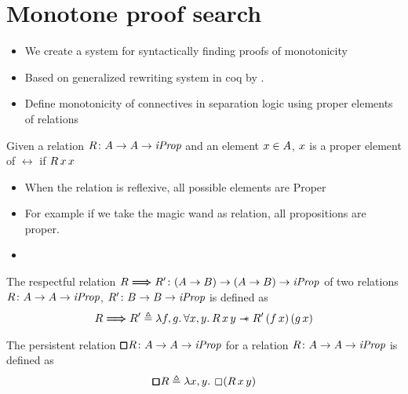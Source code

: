 \documentclass[thesis.tex]{subfiles}
\begin{document}
\section{Monotone proof search}
\begin{itemize}
    \item We create a system for syntactically finding proofs of monotonicity
    \item Based on generalized rewriting system in coq by  \cite*{sozeauNewLookGeneralized2009}.
    \item {} Define monotonicity of connectives in separation logic using proper elements of relations
\end{itemize}

\begin{definition}
    Given a relation $R\colon A\to A\to\textit{iProp}$ and an element $x\in A$, $x$ is a proper element of $\rel$ if $R\, x\, x$
\end{definition}
\begin{itemize}
    \item When the relation is reflexive, all possible elements are Proper
    \item For example if we take the magic wand as relation, all propositions are proper.
    \item
\end{itemize}
\begin{definition}
    The respectful relation $R \bm{\Longrightarrow} R'\colon(A\to B) \to (A\to B) \to \textit{iProp}$ of two relations $R\colon A\to A\to\textit{iProp}$, $R'\colon B\to B\to\textit{iProp}$ is defined as
    \begin{align*}
        \rel \respect \rel' \eqdef \Lam \func, \funcB. \All \var,\varB. \rel\, \var\, \varB \wand \rel'\, (\func\, \var)\, (\funcB\, \var)
    \end{align*}
\end{definition}

\begin{definition}
    The persistent relation $\pmb{\mathop{\boxempty}}R\colon A\to A\to\textit{iProp}$ for a relation $R\colon A\to A\to\textit{iProp}$ is defined as
    \[\persrel\rel \eqdef \Lam\var,\varB. \always (\rel\,\var\,\varB)\]
\end{definition}
\end{document}
